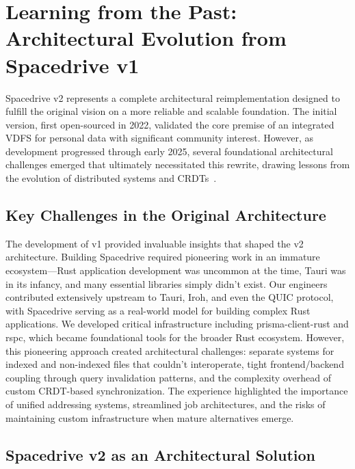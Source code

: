 \documentclass[sigconf]{acmart}
\begin{document}
\section{Learning from the Past: Architectural Evolution from Spacedrive v1}

Spacedrive v2 represents a complete architectural reimplementation designed to fulfill the original vision on a more reliable and scalable foundation. The initial version, first open-sourced in 2022, validated the core premise of an integrated VDFS for personal data with significant community interest. However, as development progressed through early 2025, several foundational architectural challenges emerged that ultimately necessitated this rewrite, drawing lessons from the evolution of distributed systems and CRDTs~\cite{shapiro_crdts_2011}.

\subsection{Key Challenges in the Original Architecture}

The development of v1 provided invaluable insights that shaped the v2 architecture. Building Spacedrive required pioneering work in an immature ecosystem—Rust application development was uncommon at the time, Tauri was in its infancy, and many essential libraries simply didn't exist. Our engineers contributed extensively upstream to Tauri, Iroh, and even the QUIC protocol, with Spacedrive serving as a real-world model for building complex Rust applications. We developed critical infrastructure including prisma-client-rust and rspc, which became foundational tools for the broader Rust ecosystem. However, this pioneering approach created architectural challenges: separate systems for indexed and non-indexed files that couldn't interoperate, tight frontend/backend coupling through query invalidation patterns, and the complexity overhead of custom CRDT-based synchronization. The experience highlighted the importance of unified addressing systems, streamlined job architectures, and the risks of maintaining custom infrastructure when mature alternatives emerge.

\subsection{Spacedrive v2 as an Architectural Solution}
\end{document}
